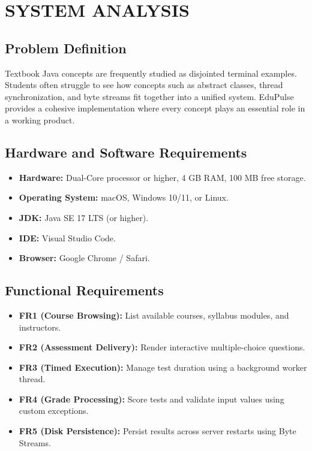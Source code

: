 \documentclass[12pt,a4paper]{article}
\begin{document}
\section{SYSTEM ANALYSIS}

\subsection{Problem Definition}
Textbook Java concepts are frequently studied as disjointed terminal examples. Students often struggle to see how concepts such as abstract classes, thread synchronization, and byte streams fit together into a unified system. EduPulse provides a cohesive implementation where every concept plays an essential role in a working product.

\subsection{Hardware and Software Requirements}
\begin{itemize}
    \item \textbf{Hardware:} Dual-Core processor or higher, 4 GB RAM, 100 MB free storage.
    \item \textbf{Operating System:} macOS, Windows 10/11, or Linux.
    \item \textbf{JDK:} Java SE 17 LTS (or higher).
    \item \textbf{IDE:} Visual Studio Code.
    \item \textbf{Browser:} Google Chrome / Safari.
\end{itemize}

\subsection{Functional Requirements}
\begin{itemize}
    \item \textbf{FR1 (Course Browsing):} List available courses, syllabus modules, and instructors.
    \item \textbf{FR2 (Assessment Delivery):} Render interactive multiple-choice questions.
    \item \textbf{FR3 (Timed Execution):} Manage test duration using a background worker thread.
    \item \textbf{FR4 (Grade Processing):} Score tests and validate input values using custom exceptions.
    \item \textbf{FR5 (Disk Persistence):} Persist results across server restarts using Byte Streams.
\end{itemize}
\end{document}

